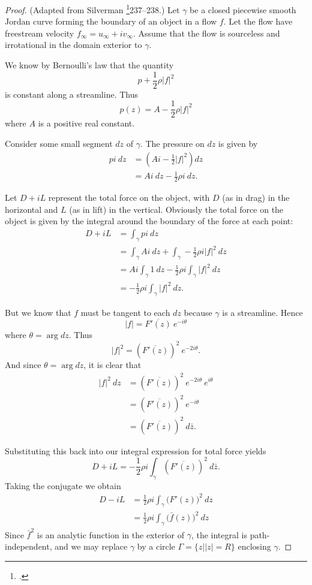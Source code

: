 \documentclass[letterpaper, twoside, 12 pt]{article}
\begin{document}
	\begin{proof}
		(Adapted from Silverman \footcite{silverman}{237--238}.)
		Let $\gamma$ be a closed piecewise smooth Jordan curve forming the boundary of an object in a flow $f$.
		Let the flow have freestream velocity $f_\infty = u_\infty + i v_\infty$.
		Assume that the flow is sourceless and irrotational in the domain exterior to $\gamma$.

		We know by Bernoulli's law that the quantity 
		\[
			p + \frac{1}{2} \rho |f|^2
		\]
		is constant along a streamline.
		Thus
		\[
			p(z) = A - \frac{1}{2} \rho |f|^2
		\]
		where $A$ is a positive real constant.

		Consider some small segment $dz$ of $\gamma$.
		The pressure on $dz$ is given by 
		\begin{align*}
			p i \> dz &= \left(  A i - \frac{1}{2} |f|^2 \right) dz \\
			&= Ai \> dz - \frac{1}{2} \rho i \> dz.
		\end{align*}
		
		Let $D + iL$ represent the total force on the object, with $D$ (as in drag) in the horizontal and $L$ (as in lift) in the vertical.
		Obviously the total force on the object is given by the integral around the boundary of the force at each point:
		\begin{align*}
			D + iL &= \int_\gamma p i \ dz  \\[1 ex]
			&= \int_\gamma Ai \ dz + \int_\gamma -\frac{1}{2} \rho i |f|^2 \ dz \\[1 ex]
			&= Ai \int_\gamma 1 \ dz - \frac{1}{2} \rho i \int_\gamma |f|^2 \ dz \\[1 ex]
			&= - \frac{1}{2} \rho i \int_\gamma |f|^2 \ dz.
		\end{align*}

		But we know that $f$ must be tangent to each $dz$ because $\gamma$ is a streamline.
		Hence
		\[
			|f| = \overline{F'(z)}\> e^{-i \theta}
		\]
		where $\theta = \arg dz$.
		Thus
		\[
			|f|^2 = \left( \overline{F'(z)} \right)^2 \> e^{-2i \theta}.
		\]
		And since $\theta = \arg dz$, it is clear that 
		\begin{align*}
			|f|^2 \ dz &= \left( \overline{F'(z)} \right)^2 \> e^{-2i \theta} \> e^{i \theta} \\
			&= \left( \overline{F'(z)} \right)^2 \> e^{-i \theta} \\
			&= \left( \overline{F'(z)} \right)^2 \ d \bar z.
		\end{align*}
		
		
		Substituting this back into our integral expression for total force yields
		\[
			D + iL = - \frac{1}{2} \rho i \int_\gamma \left( \overline{F'(z)} \right)^2 \ d \bar z.
		\]
		Taking the conjugate we obtain
		\begin{align*}
			D - iL &= \frac{1}{2} \rho i \int_\gamma \big( F'(z) \big)^2 \ dz \\
			&= \frac{1}{2} \rho i \int_\gamma \big( \bar f(z) \big)^2 \ dz  
		\end{align*}
		Since $\bar f^2$ is an analytic function in the exterior of $\gamma$, the integral is path-independent, and we may replace $\gamma$ by a circle $\Gamma = \{ z \bm{\mid} |z| = R \}$ enclosing $\gamma$.


\end{proof}
\end{document}
